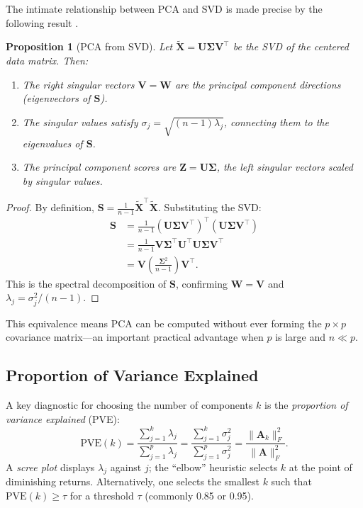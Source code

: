 \documentclass[conference]{IEEEtran}
\newtheorem{proposition}{Proposition}
\begin{document}
The intimate relationship between PCA and SVD is made precise by the following result \cite{jolliffe2002}.

\begin{proposition}[PCA from SVD]
Let $\tilde{\mathbf{X}} = \mathbf{U}\mathbf{\Sigma}\mathbf{V}^\top$ be the SVD of the centered data matrix. Then:
\begin{enumerate}
  \item The right singular vectors $\mathbf{V} = \mathbf{W}$ are the principal component directions (eigenvectors of $\mathbf{S}$).
  \item The singular values satisfy $\sigma_j = \sqrt{(n-1)\lambda_j}$, connecting them to the eigenvalues of $\mathbf{S}$.
  \item The principal component scores are $\mathbf{Z} = \mathbf{U}\mathbf{\Sigma}$, the left singular vectors scaled by singular values.
\end{enumerate}
\end{proposition}

\begin{proof}
By definition, $\mathbf{S} = \frac{1}{n-1}\tilde{\mathbf{X}}^\top\tilde{\mathbf{X}}$. Substituting the SVD:
\begin{align}
\mathbf{S} &= \frac{1}{n-1}(\mathbf{U}\mathbf{\Sigma}\mathbf{V}^\top)^\top(\mathbf{U}\mathbf{\Sigma}\mathbf{V}^\top) \nonumber \\
           &= \frac{1}{n-1}\mathbf{V}\mathbf{\Sigma}^\top\mathbf{U}^\top\mathbf{U}\mathbf{\Sigma}\mathbf{V}^\top \nonumber \\
           &= \mathbf{V}\left(\frac{\mathbf{\Sigma}^2}{n-1}\right)\mathbf{V}^\top.
\end{align}
This is the spectral decomposition of $\mathbf{S}$, confirming $\mathbf{W} = \mathbf{V}$ and $\lambda_j = \sigma_j^2/(n-1)$.
\end{proof}

This equivalence means PCA can be computed without ever forming the $p \times p$ covariance matrix—an important practical advantage when $p$ is large and $n \ll p$.

\subsection{Proportion of Variance Explained}

A key diagnostic for choosing the number of components $k$ is the \emph{proportion of variance explained} (PVE):
\begin{equation}
\text{PVE}(k) = \frac{\sum_{j=1}^k \lambda_j}{\sum_{j=1}^p \lambda_j} = \frac{\sum_{j=1}^k \sigma_j^2}{\sum_{j=1}^p \sigma_j^2} = \frac{\|\mathbf{A}_k\|_F^2}{\|\mathbf{A}\|_F^2}.
\label{eq:pve}
\end{equation}
A \emph{scree plot} displays $\lambda_j$ against $j$; the ``elbow'' heuristic selects $k$ at the point of diminishing returns. Alternatively, one selects the smallest $k$ such that $\text{PVE}(k) \geq \tau$ for a threshold $\tau$ (commonly 0.85 or 0.95).
\end{document}
